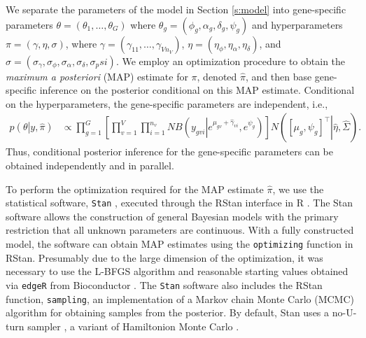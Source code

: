 \documentclass[useAMS,usenatbib,referee]{biom}
\begin{document}
We separate the parameters of the model in Section \ref{s:model} into gene-specific parameters $\theta = (\theta_1,\ldots,\theta_G)$ where $\theta_g = (\phi_g,\alpha_g,\delta_g,\psi_g)$ and hyperparameters $\pi = (\gamma, \eta, \sigma)$, where $\gamma = (\gamma_{11},\ldots,\gamma_{Vn_V})$, $\eta=(\eta_\phi,\eta_\alpha,\eta_\delta)$, and $\sigma=(\sigma_\gamma,\sigma_\phi,\sigma_\alpha,\sigma_\delta,\sigma_psi)$. We employ an optimization procedure to obtain the \emph{maximum a posteriori} (MAP) estimate for $\pi$, denoted $\hat{\pi}$, and then base gene-specific inference on the posterior conditional on this MAP estimate. Conditional on the hyperparameters, the gene-specific parameters are independent, i.e., 
\begin{align}
p\left(\theta\left|y,\hat{\pi}\right.\right) 
&\propto \prod_{g=1}^G \left[ \prod_{v=1}^V \prod_{i=1}^{n_v} NB\left(y_{gvi}\left|e^{\mu_{gv}+\hat{\gamma}_{vi}},e^{\psi_g}\right.\right) \right] N\left(\left.\left[\mu_g, \psi_g \right]^\top\right|\hat{\eta}, \hat{\Sigma} \right). 
\label{e:condind}
\end{align}
Thus, conditional posterior inference for the gene-specific parameters can be obtained independently and in parallel.

To perform the optimization required for the MAP estimate $\hat{\pi}$, we use the statistical software, {\tt Stan} \citep{stan-software:2014}, executed through the RStan interface \citep{rstan-software:2014} in R \citep{R2014}. The Stan software allows the construction of general Bayesian models with the primary restriction that all unknown parameters are continuous. With a fully constructed model, the software can obtain MAP estimates \cite[Section 50.3,][]{stan-manual:2014} using the {\tt optimizing} function in RStan. Presumably due to the large dimension of the optimization, it was necessary to use the L-BFGS algorithm \cite[Section 55,][]{stan-manual:2014} and reasonable starting values obtained via {\tt edgeR} \citep{robinson2010edgeR} from Bioconductor \citep{gentleman2004bioconductor}. The {\tt Stan} software also includes the RStan function, {\tt sampling}, an implementation of a Markov chain Monte Carlo (MCMC) algorithm for obtaining samples from the posterior. By default, Stan uses a no-U-turn sampler \citep{hoffman2013no}, a variant of Hamiltonion Monte Carlo \citep{neal2011mcmc}.
\end{document}
